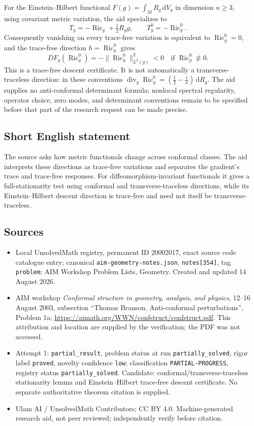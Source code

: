 \documentclass[11pt]{article}
\newcommand{\dd}{\,\mathrm{d}}
\begin{document}
For the Einstein--Hilbert functional \(F(g)=\int_M R_g\dd V_g\) in dimension \(n\ge3\), using covariant metric variation, the aid specializes to
\[
 T_g=-\operatorname{Ric}_g+\tfrac12R_gg,\qquad
 T_g^0=-\operatorname{Ric}_g^0.
\]
Consequently vanishing on every trace-free variation is equivalent to \(\operatorname{Ric}_g^0=0\), and the trace-free direction \(h=\operatorname{Ric}_g^0\) gives
\[
 D F_g(\operatorname{Ric}_g^0)
 =-\|\operatorname{Ric}_g^0\|_{L^2(g)}^2<0
 \quad\text{if }\operatorname{Ric}_g^0\not\equiv0.
\]
This is a trace-free descent certificate. It is not automatically a transverse-traceless direction: in these conventions
\(\operatorname{div}_g\operatorname{Ric}_g^0=(\tfrac12-\tfrac1n)\dd R_g\).
The aid supplies no anti-conformal determinant formula; nonlocal spectral regularity, operator choice, zero modes, and determinant conventions remain to be specified before that part of the research request can be made precise.
\subsection{Short English statement}
The source asks how metric functionals change across conformal classes. The aid interprets these directions as trace-free variations and separates the gradient's trace and trace-free responses. For diffeomorphism-invariant functionals it gives a full-stationarity test using conformal and transverse-traceless directions, while its Einstein--Hilbert descent direction is trace-free and need not itself be transverse-traceless.
\subsection{Sources}
\begin{itemize}
\item Local UnsolvedMath registry, permanent ID 20002017, exact source code catalogue entry; canonical \texttt{aim-geometry-notes.json}, \texttt{notes[354]}, tag \texttt{problem}; AIM Workshop Problem Lists, Geometry. Created and updated 14 August 2026.
\item AIM workshop \emph{Conformal structure in geometry, analysis, and physics}, 12--16 August 2003, subsection ``Thomas Branson. Anti-conformal perturbations'', Problem 1a; \url{https://aimath.org/WWN/confstruct/confstruct.pdf}. This attribution and location are supplied by the verification; the PDF was not accessed.
\item Attempt 1: \texttt{partial\_result}, problem status at run \texttt{partially\_solved}, rigor label \texttt{proved}, novelty confidence \texttt{low}; classification \texttt{PARTIAL-PROGRESS}, registry status \texttt{partially\_solved}. Candidate: conformal/transverse-traceless stationarity lemma and Einstein--Hilbert trace-free descent certificate. No separate authoritative theorem citation is supplied.
\item Ulam AI / UnsolvedMath Contributors; CC BY 4.0. Machine-generated research aid, not peer reviewed; independently verify before citation.
\end{itemize}
\end{document}
